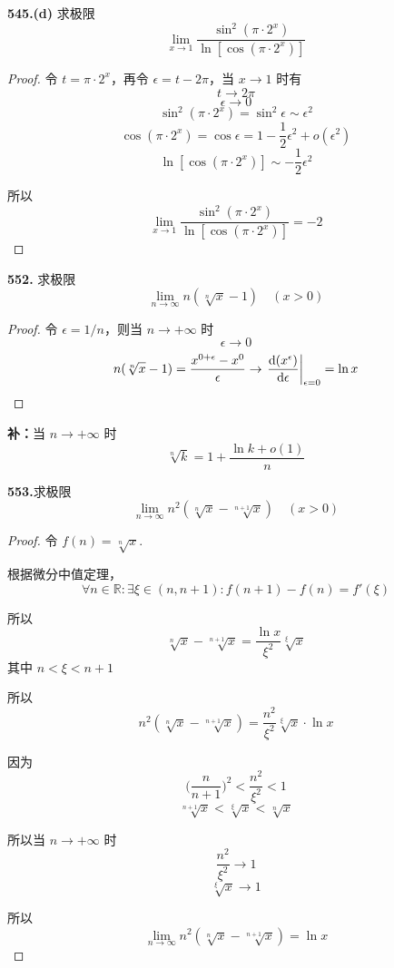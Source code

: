 \textbf{545.(d)} 求极限
\[\lim_{x \rightarrow 1} \frac{\sin^2(\pi \cdot 2^x)}{\ln[\cos(\pi \cdot 2^x)]}\]
\begin{proof}
    令 $t = \pi \cdot 2^x$，再令 $\epsilon = t - 2\pi$，当 $x \rightarrow 1$ 时有
    \[t \rightarrow 2\pi\]
    \[\epsilon \rightarrow 0\]
    \[\sin^2(\pi \cdot 2^x) = \sin^2 \epsilon \sim \epsilon^2\]
    \[\cos(\pi \cdot 2^x) = \cos \epsilon = 1 - \frac{1}{2}\epsilon^2 + o(\epsilon^2)\]
    \[\ln[\cos(\pi \cdot 2^x)] \sim -\frac{1}{2}\epsilon^2\]
    
    所以
    \[\lim_{x \rightarrow 1} \frac{\sin^2(\pi \cdot 2^x)}{\ln[\cos(\pi \cdot 2^x)]} = -2\]
\end{proof}\vspace{9pt}

\textbf{552.} 求极限
\[\lim_{n \rightarrow \infty} n(\sqrt[n]{x} - 1) \quad (x > 0)\]
\begin{proof}
    令 $\epsilon = 1/n$，则当 $n \rightarrow +\infty$ 时
    \[\epsilon \rightarrow 0\]
    \[n(\sqrt[n]{x} - 1) = \frac{x^{0 + \epsilon} - x^0}{\epsilon} \rightarrow \left.\frac{\mathop{}\!\mathrm{d} (x^\epsilon)}{\mathop{}\!\mathrm{d} \epsilon}\right|_{\epsilon = 0} =\ln x\]
\end{proof}\vspace{9pt}

\textbf{补：}当 $n \rightarrow +\infty$ 时
\[\sqrt[n]{k} = 1 + \frac{\ln k + o(1)}{n}\]\vspace{9pt}

\textbf{553.}求极限
\[\lim_{n \rightarrow \infty} n^2 (\sqrt[n]{x} - \sqrt[n+1]{x}) \quad (x > 0)\]
\begin{proof}
    令 $f(n) = \sqrt[n]{x}$.

    根据微分中值定理，
    \[\forall n \in \mathbb{R}: \exists \xi \in (n, n+1): f(n+1) - f(n) = f'(\xi)\]

    所以
    \[\sqrt[n]{x} - \sqrt[n+1]{x} = \frac{\ln x}{\xi^2} \sqrt[\xi]{x}\]
    其中 $n < \xi < n+1$

    所以
    \[n^2 (\sqrt[n]{x} - \sqrt[n+1]{x}) = \frac{n^2}{\xi^2} \sqrt[\xi]{x} \cdot \ln x\]

    因为
    \[\biggl(\frac{n}{n+1}\biggr)^2 < \frac{n^2}{\xi^2} < 1\]
    \[\sqrt[n+1]{x} < \sqrt[\xi]{x} < \sqrt[n]{x}\]

    所以当 $n \rightarrow +\infty$ 时
    \[\frac{n^2}{\xi^2} \rightarrow 1\]
    \[\sqrt[\xi]{x} \rightarrow 1\]

    所以
    \[\lim_{n \rightarrow \infty} n^2 (\sqrt[n]{x} - \sqrt[n+1]{x}) = \ln x\]
\end{proof}\vspace{9pt}

